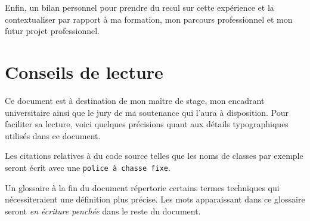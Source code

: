 Enfin, un bilan personnel pour prendre du recul sur cette expérience et la
contextualiser par rapport à ma formation, mon parcours professionnel et mon
futur projet professionnel.

\section*{Conseils de lecture}

Ce document est à destination de mon maître de stage, mon encadrant
universitaire ainsi que le jury de ma soutenance qui l'aura à disposition. Pour
faciliter sa lecture, voici quelques précisions quant aux détails typographiques
utilisés dans ce document.

Les citations relatives à du code source telles que les noms de classes par
exemple seront écrit avec une {\tt police à chasse fixe}.

Un glossaire à la fin du document répertorie certains termes techniques qui
nécessiteraient une définition plus précise. Les mots apparaissant dans ce
glossaire seront {\sl en écriture penchée} dans le reste du document.
